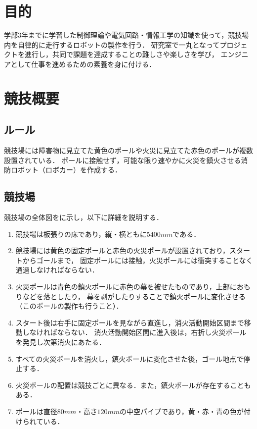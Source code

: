 \documentclass[11pt,a4]{jsarticle}
\begin{document}
  

\newpage
  \tableofcontents

\newpage
\section{目的} 

  学部3年までに学習した制御理論や電気回路・情報工学の知識を使って，競技場内を自律的に走行するロボットの製作を行う．
  研究室で一丸となってプロジェクトを進行し，共同で課題を達成することの難しさや楽しさを学び，
  エンジニアとして仕事を進めるための素養を身に付ける．

\section{競技概要} 

  \subsection{ルール}
    競技場には障害物に見立てた黄色のポールや火災に見立てた赤色のポールが複数設置されている．
    ポールに接触せず，可能な限り速やかに火災を鎮火させる消防ロボット（ロボカー）を作成する．

  \subsection{競技場}
    競技場の全体図をに示し，以下に詳細を説明する．

    \begin{enumerate}
      \item 競技場は板張りの床であり，縦・横ともに$5400\unit{mm}$である．
      \item 競技場には黄色の固定ポールと赤色の火災ポールが設置されており，スタートからゴールまで，
            固定ポールには接触，火災ポールには衝突することなく通過しなければならない．
      \item 火災ポールは青色の鎮火ポールに赤色の幕を被せたものであり，上部におもりなどを落としたり，
            幕を剥がしたりすることで鎮火ポールに変化させる（このポールの製作も行うこと）．
      \item スタート後は右手に固定ポールを見ながら直進し，消火活動開始区間まで移動しなければならない．
            消火活動開始区間に進入後は，右折し火災ポールを発見し次第消火にあたる．
      \item すべての火災ポールを消火し，鎮火ポールに変化させた後，ゴール地点で停止する．
      \item 火災ポールの配置は競技ごとに異なる．また，鎮火ポールが存在することもある．
      \item ポールは直径$80\unit{mm}$・高さ$120\unit{mm}$の中空パイプであり，黄・赤・青の色が付けられている．
    \end{enumerate}
\end{document}

